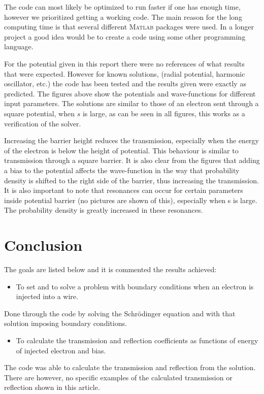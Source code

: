 \documentclass[a4paper]{article}
\begin{document}
The code can most likely be optimized to run faster if one has enough time, however we prioritized getting a working code. The main reason for the long computing time is that several different \textsc{Matlab} packages were used. In a longer project a good idea would be to create a code using some other programming language.


For the potential given in this report there were no references of what results that were expected. However for known solutions, (radial potential, harmonic oscillator, etc.) the code has been tested and the results given were exactly as predicted. The figures above show the potentials and wave-functions for different input parameters. The solutions are similar to those of an electron sent through a square potential, when $ s$ is large, as can be seen in all figures, this works as a verification of the solver.


Increasing the barrier height reduces the transmission, especially when the energy of the electron is below the height of potential. This behaviour is similar to transmission through a square barrier. It is also clear from the figures that adding a bias to the potential affects the wave-function in the way that probability density is shifted to the right side of the barrier, thus increasing the transmission. It is also important to note that resonances can occur for certain parameters inside potential barrier (no pictures are shown of this), especially when s is large. The probability density is greatly increased in these resonances. 
 

\section{Conclusion}

The goals are listed below and it is commented the results achieved:
\begin{itemize}
\item To set and to solve a problem with boundary conditions when an electron is injected into a wire.
\end{itemize}
Done through the code by solving the Schr\"odinger equation and with that solution imposing boundary conditions.
\begin{itemize}
\item To calculate the transmission and reflection coefficients as  functions of energy of injected electron and bias.
\end{itemize}

The code was able to calculate the transmission and reflection from the solution. There are however, no specific examples of the calculated transmission or reflection shown in this article.
\end{document}
